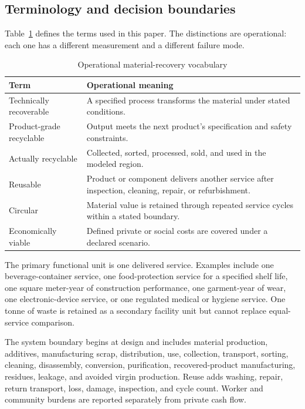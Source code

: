 \documentclass[conference]{IEEEtran}
\begin{document}
\subsection{Terminology and decision boundaries}

Table~\ref{tab:terms} defines the terms used in this paper. The distinctions are operational: each one has a different measurement and a different failure mode.

\begin{table}[t]
\caption{Operational material-recovery vocabulary}
\label{tab:terms}
\centering
\footnotesize
\setlength{\tabcolsep}{3pt}
\begin{tabular}{p{}p{}}
\toprule
Term & Operational meaning\\
\midrule
Technically recoverable & A specified process transforms the material under stated conditions.\\
Product-grade recyclable & Output meets the next product's specification and safety constraints.\\
Actually recyclable & Collected, sorted, processed, sold, and used in the modeled region.\\
Reusable & Product or component delivers another service after inspection, cleaning, repair, or refurbishment.\\
Circular & Material value is retained through repeated service cycles within a stated boundary.\\
Economically viable & Defined private or social costs are covered under a declared scenario.\\
\bottomrule
\end{tabular}
\end{table}

The primary functional unit is one delivered service. Examples include one beverage-container service, one food-protection service for a specified shelf life, one square meter-year of construction performance, one garment-year of wear, one electronic-device service, or one regulated medical or hygiene service. One tonne of waste is retained as a secondary facility unit but cannot replace equal-service comparison.

The system boundary begins at design and includes material production, additives, manufacturing scrap, distribution, use, collection, transport, sorting, cleaning, disassembly, conversion, purification, recovered-product manufacturing, residues, leakage, and avoided virgin production. Reuse adds washing, repair, return transport, loss, damage, inspection, and cycle count. Worker and community burdens are reported separately from private cash flow.
\end{document}
